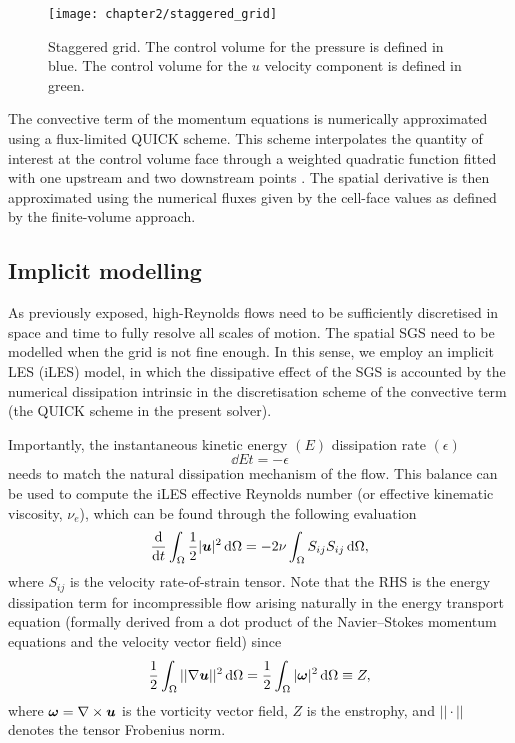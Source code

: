 \documentclass[../main.tex]{subfiles}
\begin{document}
\begin{figure}[t]
\centering
\texttt{[image: chapter2/staggered\_grid]}
\caption{Staggered grid.
The control volume for the pressure is defined in blue.
The control volume for the $u$ velocity component is defined in green.}
\label{fig:grid}
\end{figure}

The convective term of the momentum equations is numerically approximated using a flux-limited QUICK scheme.
This scheme interpolates the quantity of interest at the control volume face through a weighted quadratic function fitted with one upstream and two downstream points \citep{Leonard1979}.
The spatial derivative is then approximated using the numerical fluxes given by the cell-face values as defined by the finite-volume approach.

\subsection{Implicit modelling}

As previously exposed, high-Reynolds flows need to be sufficiently discretised in space and time to fully resolve all scales of motion.
The spatial SGS need to be modelled when the grid is not fine enough.
In this sense, we employ an implicit LES (iLES) model, in which the dissipative effect of the SGS is accounted by the numerical dissipation intrinsic in the discretisation scheme of the convective term (the QUICK scheme in the present solver).

Importantly, the instantaneous kinetic energy $(E)$ dissipation rate $(\epsilon)$
\begin{equation}
\dd{E}{t}=-\epsilon
\end{equation}
needs to match the natural dissipation mechanism of the flow.
This balance can be used to compute the iLES effective Reynolds number (or effective kinematic viscosity, $\nu_e$), which can be found through the following evaluation \citep{Domaradzki2003,Aspden2008,Zhou2014}
\begin{equation}
\frac{\mathrm{d} }{\mathrm{d} t}\int_\Omega\frac{1}{2}|\boldsymbol{u}|^2\,\mathrm{d}\Omega=-2\nu\int_\Omega S_{ij}S_{ij}\,\mathrm{d}\Omega,\label{eq:iles}
\end{equation}
where $S_{ij}$ is the velocity rate-of-strain tensor.
Note that the RHS is the energy dissipation term for incompressible flow arising naturally in the energy transport equation (formally derived from a dot product of the Navier--Stokes momentum equations and the velocity vector field) since \citep[p. 17]{Doering1995}
\begin{equation}
\frac{1}{2}\int_\Omega||\nabla\boldsymbol{u}||^2\,\mathrm{d}\Omega=\frac{1}{2}\int_\Omega|\boldsymbol{\omega}|^2\,\mathrm{d}\Omega\equiv Z,
\end{equation}
where $\boldsymbol\omega=\nabla\times\boldsymbol{u}$ is the vorticity vector field, $Z$ is the enstrophy, and $||\cdot||$ denotes the tensor Frobenius norm.
\end{document}
